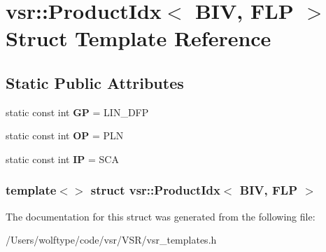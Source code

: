 \hypertarget{structvsr_1_1_product_idx_3_01_b_i_v_00_01_f_l_p_01_4}{\section{vsr\-:\-:Product\-Idx$<$ B\-I\-V, F\-L\-P $>$ Struct Template Reference}
\label{structvsr_1_1_product_idx_3_01_b_i_v_00_01_f_l_p_01_4}
}
\subsection*{Static Public Attributes}
\begin{DoxyCompactItemize}
\item 
\hypertarget{structvsr_1_1_product_idx_3_01_b_i_v_00_01_f_l_p_01_4_ae81ad9c32ae00217cb3219e6abdee12d}{static const int {\bfseries G\-P} = L\-I\-N\-\_\-\-D\-F\-P}\label{structvsr_1_1_product_idx_3_01_b_i_v_00_01_f_l_p_01_4_ae81ad9c32ae00217cb3219e6abdee12d}

\item 
\hypertarget{structvsr_1_1_product_idx_3_01_b_i_v_00_01_f_l_p_01_4_af7f11a660e27f2cf628bc176eabb8807}{static const int {\bfseries O\-P} = P\-L\-N}\label{structvsr_1_1_product_idx_3_01_b_i_v_00_01_f_l_p_01_4_af7f11a660e27f2cf628bc176eabb8807}

\item 
\hypertarget{structvsr_1_1_product_idx_3_01_b_i_v_00_01_f_l_p_01_4_a2602f86e20ca0b450b472f403b40b0d4}{static const int {\bfseries I\-P} = S\-C\-A}\label{structvsr_1_1_product_idx_3_01_b_i_v_00_01_f_l_p_01_4_a2602f86e20ca0b450b472f403b40b0d4}

\end{DoxyCompactItemize}
\subsubsection*{template$<$$>$ struct vsr\-::\-Product\-Idx$<$ B\-I\-V, F\-L\-P $>$}



The documentation for this struct was generated from the following file\-:\begin{DoxyCompactItemize}
\item 
/\-Users/wolftype/code/vsr/\-V\-S\-R/vsr\-\_\-templates.\-h\end{DoxyCompactItemize}
